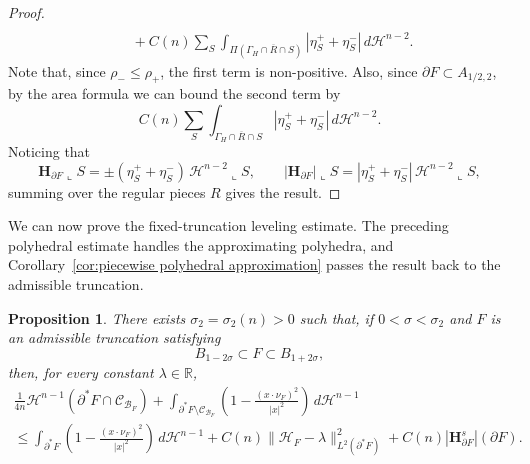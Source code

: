 \documentclass[reqno,11pt]{amsart}
\makeatletter
\def\sz{\sigma}
\newcommand{\R}{\mathbb R}
\newcommand{\HH}{\mathscr H}
\newtheorem{prop}[thm]{Proposition}%
\numberwithin{equation}{section}
\theoremstyle{remark}
\makeatother
\begin{document}
\begin{proof}
\begin{align*}
\\
&\quad +C(n)\sum_S
\int_{\Pi(\Gamma_H\cap\overline R\cap S)}
|\eta_S^++\eta_S^-|\,d\HH^{n-2}.
\end{align*}
Note that,  since $\rho_- \leq \rho_+$, the first term is non-positive. Also, since $\partial F\subset A_{1/2,2}$, by the area formula we can bound the second term by  
\[
C(n)\sum_S\int_{\Gamma_H\cap\overline R\cap S}
|\eta_S^++\eta_S^-|\,d\HH^{n-2}.
\]
Noticing that
\begin{equation}\label{eq:poly-edge-curvature}
\mathbf H_{\partial F}\llcorner S
=\pm(\eta^+_S+\eta^-_S)\,\HH^{n-2}\llcorner S,
\qquad
|\mathbf H_{\partial F}|\llcorner S
=|\eta^+_S+\eta^-_S|\,\HH^{n-2}\llcorner S,
\end{equation}
summing over the regular pieces $R$ gives the result.
\end{proof}

We can now prove the fixed-truncation leveling estimate. The preceding
polyhedral estimate handles the approximating polyhedra, and
Corollary~\ref{cor:piecewise polyhedral approximation} passes the result back
to the admissible truncation.

\begin{prop}\label{leveling oscillation}
There exists $\sz_2=\sz_2(n)>0$ such that, if $0<\sz<\sz_2$ and
$F$ is an admissible truncation satisfying
$$
B_{1-2\sz}\subset F\subset B_{1+2\sz},
$$
then, for every constant $\lambda\in\R$,
\begin{multline}\label{eq:leveling-fixed-F}
\frac1{4n}\HH^{n-1}(\partial^*F\cap\mathcal C_{\mathcal B_F})
+\int_{\partial^*F\setminus\mathcal C_{\mathcal B_F}}
\left(1-\frac{(x\cdot\nu_F)^2}{|x|^2}\right)\,d\HH^{n-1}\\
\le
\int_{\partial^*F}
\left(1-\frac{(x\cdot\nu_F)^2}{|x|^2}\right)\,d\HH^{n-1}
+C(n)\|\mathcal H_F-\lambda\|_{L^2(\partial^*F)}^2
+C(n)|\mathbf H^s_{\partial F}|(\partial F).
\end{multline}
\end{prop}
\end{document}
